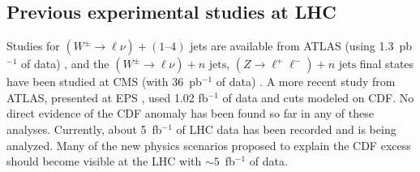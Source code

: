 \subsection{Previous experimental studies at LHC}
\label{sec:previousLHC}
Studies for $(W^\pm \to \ell \nu)+(\text{1--4})$ jets are available 
from ATLAS (using 1.3~pb$^{-1}$ of data) 
\cite{ATLASWVjets}, and the 
$(W^\pm \to \ell \nu) + n\text{ jets}$, 
$(Z\to\ell^+\ell^-)+n\text{ jets}$ final states have been 
studied at CMS (with 36~pb$^{-1}$ of data) \cite{CMSVjets}. 
A more recent study from ATLAS, presented at EPS \cite{ATLASWdijet}, 
used 1.02 fb$^{-1}$ of data and cuts modeled on CDF.
No direct evidence of the CDF anomaly has been found so far in any 
of these analyses.
Currently, about 5~fb$^{-1}$ of LHC data has been recorded and is
being analyzed. Many of the new physics 
scenarios proposed to explain the CDF excess should become 
visible at the LHC with $\sim5$~fb$^{-1}$ of data.
